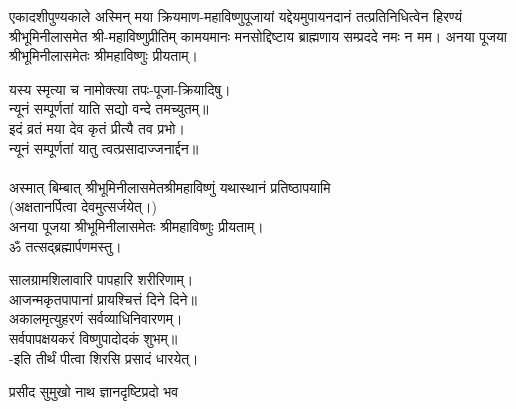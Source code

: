 \hiranyagarbha
 
एकादशीपुण्यकाले अस्मिन् मया क्रियमाण-महाविष्णुपूजायां यद्देयमुपायनदानं तत्प्रतिनिधित्वेन हिरण्यं श्रीभूमिनीलासमेत श्री-महाविष्णुप्रीतिम् 
कामयमानः मनसोद्दिष्टाय ब्राह्मणाय सम्प्रददे नमः न मम। 
अनया पूजया श्रीभूमिनीलासमेतः श्रीमहाविष्णुः प्रीयताम्। 
 
 यस्य स्मृत्या च नामोक्त्या तपः-पूजा-क्रियादिषु।\\
न्यूनं सम्पूर्णतां याति सद्यो वन्दे तमच्युतम्॥ \\
इदं व्रतं मया देव कृतं प्रीत्यै तव प्रभो।\\
न्यूनं सम्पूर्णतां यातु त्वत्प्रसादाज्जनार्द्दन॥\\
 \\
अस्मात् बिम्बात् श्रीभूमिनीलासमेतश्रीमहाविष्णुं यथास्थानं प्रतिष्ठापयामि\\
(अक्षतानर्पित्वा देवमुत्सर्जयेत्।)\\
अनया पूजया श्रीभूमिनीलासमेतः श्रीमहाविष्णुः प्रीयताम्। \\
ॐ तत्सद्ब्रह्मार्पणमस्तु।
 
सालग्रामशिलावारि पापहारि शरीरिणाम्।\\
आजन्मकृतपापानां प्रायश्चित्तं दिने दिने॥\\
अकालमृत्युहरणं सर्वव्याधिनिवारणम्।\\
सर्वपापक्षयकरं विष्णुपादोदकं शुभम्॥ \\
 -इति तीर्थं पीत्वा शिरसि प्रसादं धारयेत्।



{प्रसीद सुमुखो नाथ ज्ञानदृष्टिप्रदो भव}
